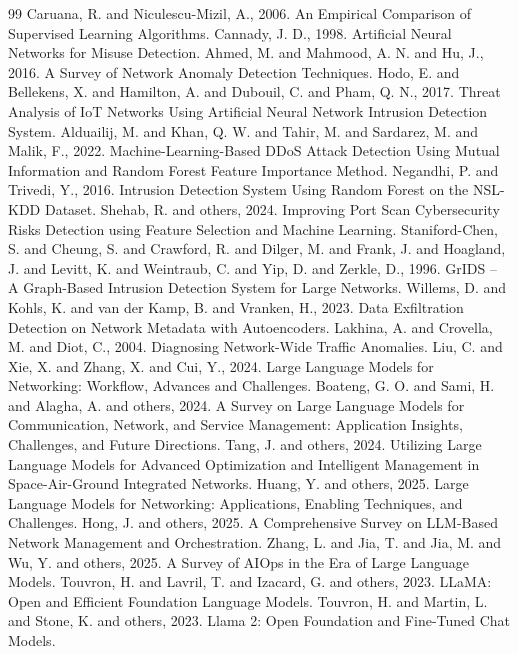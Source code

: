 \documentclass[12pt,a4paper]{article}
\begin{document}
\begin{thebibliography}{99}
 Caruana, R. and Niculescu-Mizil, A., 2006. An Empirical Comparison of Supervised Learning Algorithms.
 Cannady, J. D., 1998. Artificial Neural Networks for Misuse Detection.
 Ahmed, M. and Mahmood, A. N. and Hu, J., 2016. A Survey of Network Anomaly Detection Techniques.
 Hodo, E. and Bellekens, X. and Hamilton, A. and Dubouil, C. and Pham, Q. N., 2017. Threat Analysis of IoT Networks Using Artificial Neural Network Intrusion Detection System.
 Alduailij, M. and Khan, Q. W. and Tahir, M. and Sardarez, M. and Malik, F., 2022. Machine-Learning-Based DDoS Attack Detection Using Mutual Information and Random Forest Feature Importance Method.
 Negandhi, P. and Trivedi, Y., 2016. Intrusion Detection System Using Random Forest on the NSL-KDD Dataset.
 Shehab, R. and others, 2024. Improving Port Scan Cybersecurity Risks Detection using Feature Selection and Machine Learning.
 Staniford-Chen, S. and Cheung, S. and Crawford, R. and Dilger, M. and Frank, J. and Hoagland, J. and Levitt, K. and Weintraub, C. and Yip, D. and Zerkle, D., 1996. GrIDS -- A Graph-Based Intrusion Detection System for Large Networks.
 Willems, D. and Kohls, K. and van der Kamp, B. and Vranken, H., 2023. Data Exfiltration Detection on Network Metadata with Autoencoders.
 Lakhina, A. and Crovella, M. and Diot, C., 2004. Diagnosing Network-Wide Traffic Anomalies.
 Liu, C. and Xie, X. and Zhang, X. and Cui, Y., 2024. Large Language Models for Networking: Workflow, Advances and Challenges.
 Boateng, G. O. and Sami, H. and Alagha, A. and others, 2024. A Survey on Large Language Models for Communication, Network, and Service Management: Application Insights, Challenges, and Future Directions.
 Tang, J. and others, 2024. Utilizing Large Language Models for Advanced Optimization and Intelligent Management in Space-Air-Ground Integrated Networks.
 Huang, Y. and others, 2025. Large Language Models for Networking: Applications, Enabling Techniques, and Challenges.
 Hong, J. and others, 2025. A Comprehensive Survey on LLM-Based Network Management and Orchestration.
 Zhang, L. and Jia, T. and Jia, M. and Wu, Y. and others, 2025. A Survey of AIOps in the Era of Large Language Models.
 Touvron, H. and Lavril, T. and Izacard, G. and others, 2023. LLaMA: Open and Efficient Foundation Language Models.
 Touvron, H. and Martin, L. and Stone, K. and others, 2023. Llama 2: Open Foundation and Fine-Tuned Chat Models.

\end{thebibliography}
\end{document}
